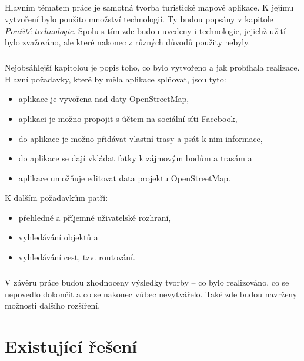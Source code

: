 \documentclass[11pt,a4paper,titlepage,oneside]{book}
\begin{document}
	\paragraph{} Hlavním tématem práce je samotná tvorba turistické mapové aplikace. K jejímu vytvoření bylo použito množství technologií. Ty budou popsány v kapitole \textit{Použité technologie}. Spolu s tím zde budou uvedeny i technologie, jejichž užití bylo zvažováno, ale které nakonec z různých důvodů použity nebyly.
	\paragraph{}Nejobsáhlejší kapitolou je popis toho, co bylo vytvořeno a jak probíhala realizace. Hlavní požadavky, které by měla aplikace splňovat, jsou tyto:
		\begin{itemize}
			\item aplikace je vyvořena nad daty OpenStreetMap,
			\item aplikaci je možno propojit s účtem na sociální síti Facebook,
			\item do aplikace je možno přidávat vlastní trasy a psát k nim informace,
			\item do aplikace se dají vkládat fotky k zájmovým bodům a trasám a
			\item aplikace umožňuje editovat data projektu OpenStreetMap.
		\end{itemize}
	K dalším požadavkům patří:
		\begin{itemize}
			\item přehledné a příjemné uživatelské rozhraní,
			\item vyhledávání objektů a
			\item vyhledávání cest, tzv. routování.
		\end{itemize}
	
	\paragraph{} V závěru práce budou zhodnoceny výsledky tvorby -- co bylo realizováno, co se nepovedlo dokončit a co se nakonec vůbec nevytvářelo. Také zde budou navrženy možnosti dalšího rozšíření.


\pagestyle{fancy}


\chapter{Existující řešení}
\end{document}

